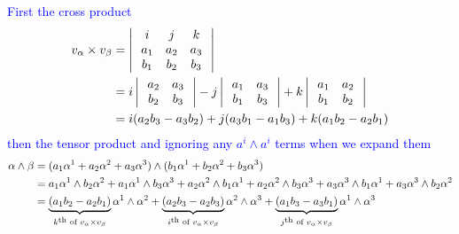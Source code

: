 \documentclass[10pt,a4paper]{report}
\newcommand{\BLUE}[1]{\textcolor{blue}{#1}}
\begin{document}
\begin{enumerate}[label=4.\arabic*]
\BLUE{First the cross product\begin{align*}
	v_\alpha \times v_\beta &= \left |\,  \begin{array}{c c c} i&j&k \\ a_1 & a_2 & a_3 \\ b_1 & b_2 & b_3 \end{array}  \,\right |\\
	&= i\left |\,  \begin{array}{c c} a_2&a_3 \\ b_2 & b_3 \end{array}  \,\right | - j\left |\,  \begin{array}{c c} a_1&a_3 \\ b_1 & b_3 \end{array}  \,\right | + k\left |\,  \begin{array}{c c} a_1&a_2 \\ b_1 & b_2 \end{array}  \,\right | \\
	&=i(a_2b_3-a_3b_2)+j(a_3b_1-a_1b_3)+k(a_1b_2-a_2b_1)
\end{align*}then the tensor product and ignoring any $a^i\wedge a^i$ terms when we expand them
\begin{align*}
	\alpha \wedge \beta &= (a_1\alpha^1 + a_2\alpha^2 + a_3\alpha^3)\wedge(b_1\alpha^1 + b_2\alpha^2 + b_3\alpha^3) \\
	&= a_1\alpha^1\wedge b_2\alpha^2 + a_1\alpha^1\wedge b_3\alpha^3 + a_2\alpha^2\wedge b_1\alpha^1 + a_2\alpha^2\wedge b_3\alpha^3 + a_3\alpha^3\wedge b_1\alpha^1 + a_3\alpha^3\wedge b_2\alpha^2 \\
	&= \underbrace{(a_1b_2-a_2b_1)}_{k\textsuperscript{th} \text{ of }v_\alpha\times v_\beta}\alpha^1\wedge\alpha^2 + \underbrace{(a_2b_3-a_2b_3)}_{i\textsuperscript{th} \text{ of }v_\alpha\times v_\beta}\alpha^2\wedge\alpha^3 + \underbrace{(a_1b_3-a_3b_1)}_{j\textsuperscript{th} \text{ of }v_\alpha\times v_\beta}\alpha^1\wedge\alpha^3
\end{align*}
}

\end{enumerate}
\end{document}
